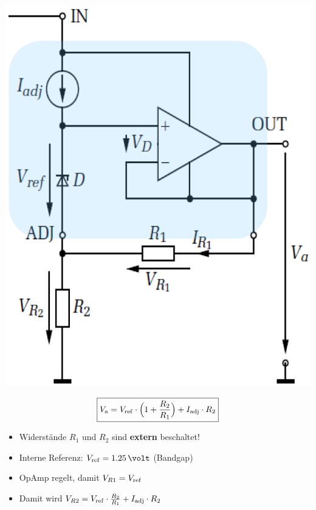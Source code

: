 \begin{minipage}[c]{0.22\columnwidth}
    \includegraphics[width=\columnwidth]{images/einstellbarer_seriespannungsregler.png}
\end{minipage}
\hfill
\begin{minipage}[c]{0.76\columnwidth}
    $$ \boxed{ V_{\rm a} = V_{\rm ref} \cdot \Big( 1 + \frac{R_2}{R_1} \Big) + I_{\rm adj} \cdot R_2 }$$
    \begin{itemize}
        \item Widerstände $R_1$ und $R_2$ sind \textbf{extern} beschaltet!
        \item Interne Referenz: $V_{\rm ref} = 1.25 \, \volt$ (Bandgap)
        \item OpAmp regelt, damit $V_{R1} = V_{\rm ref}$
        \item Damit wird $V_{R2} = V_{\rm ref} \cdot \frac{R_2}{R_1} + I_{\rm adj} \cdot R_2$
    \end{itemize}
\end{minipage}

